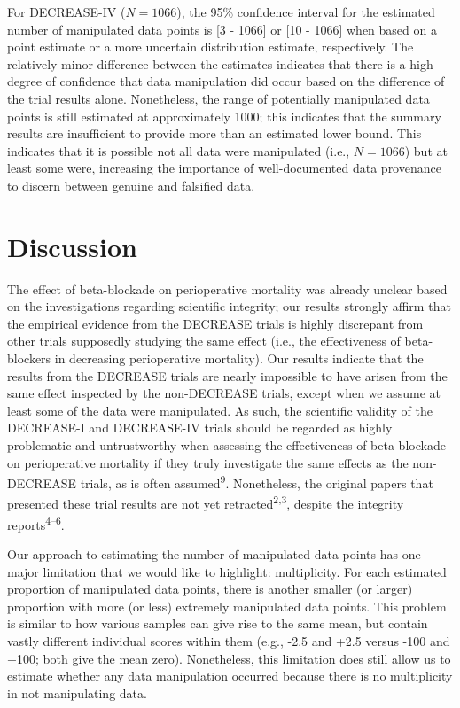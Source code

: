 \documentclass[]{article}
\begin{document}
For DECREASE-IV (\(N=1066\)), the 95\% confidence interval for the
estimated number of manipulated data points is {[}3 - 1066{]} or {[}10 -
1066{]} when based on a point estimate or a more uncertain distribution
estimate, respectively. The relatively minor difference between the
estimates indicates that there is a high degree of confidence that data
manipulation did occur based on the difference of the trial results
alone. Nonetheless, the range of potentially manipulated data points is
still estimated at approximately 1000; this indicates that the summary
results are insufficient to provide more than an estimated lower bound.
This indicates that it is possible not all data were manipulated (i.e.,
\(N=1066\)) but at least some were, increasing the importance of
well-documented data provenance to discern between genuine and falsified
data.

\section{Discussion}\label{discussion}

The effect of beta-blockade on perioperative mortality was already
unclear based on the investigations regarding scientific integrity; our
results strongly affirm that the empirical evidence from the DECREASE
trials is highly discrepant from other trials supposedly studying the
same effect (i.e., the effectiveness of beta-blockers in decreasing
perioperative mortality). Our results indicate that the results from the
DECREASE trials are nearly impossible to have arisen from the same
effect inspected by the non-DECREASE trials, except when we assume at
least some of the data were manipulated. As such, the scientific
validity of the DECREASE-I and DECREASE-IV trials should be regarded as
highly problematic and untrustworthy when assessing the effectiveness of
beta-blockade on perioperative mortality if they truly investigate the
same effects as the non-DECREASE trials, as is often
assumed\textsuperscript{9}. Nonetheless, the original papers that
presented these trial results are not yet
retracted\textsuperscript{2,3}, despite the integrity
reports\textsuperscript{4--6}.

Our approach to estimating the number of manipulated data points has one
major limitation that we would like to highlight: multiplicity. For each
estimated proportion of manipulated data points, there is another
smaller (or larger) proportion with more (or less) extremely manipulated
data points. This problem is similar to how various samples can give
rise to the same mean, but contain vastly different individual scores
within them (e.g., -2.5 and +2.5 versus -100 and +100; both give the
mean zero). Nonetheless, this limitation does still allow us to estimate
whether any data manipulation occurred because there is no multiplicity
in not manipulating data.
\end{document}
